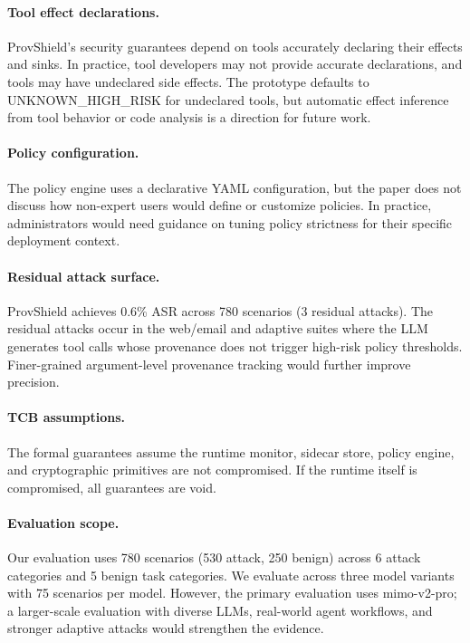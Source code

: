 \documentclass[sigconf,anonymous,review]{acmart}
\begin{document}
\paragraph{Tool effect declarations.} ProvShield's security guarantees depend on tools accurately declaring their effects and sinks. In practice, tool developers may not provide accurate declarations, and tools may have undeclared side effects. The prototype defaults to UNKNOWN\_HIGH\_RISK for undeclared tools, but automatic effect inference from tool behavior or code analysis is a direction for future work.

\paragraph{Policy configuration.} The policy engine uses a declarative YAML configuration, but the paper does not discuss how non-expert users would define or customize policies. In practice, administrators would need guidance on tuning policy strictness for their specific deployment context.

\paragraph{Residual attack surface.} ProvShield achieves 0.6\% ASR across 780 scenarios (3 residual attacks). The residual attacks occur in the web/email and adaptive suites where the LLM generates tool calls whose provenance does not trigger high-risk policy thresholds. Finer-grained argument-level provenance tracking would further improve precision.

\paragraph{TCB assumptions.} The formal guarantees assume the runtime monitor, sidecar store, policy engine, and cryptographic primitives are not compromised. If the runtime itself is compromised, all guarantees are void.
\paragraph{Evaluation scope.} Our evaluation uses 780 scenarios (530 attack, 250 benign) across 6 attack categories and 5 benign task categories. We evaluate across three model variants with 75 scenarios per model. However, the primary evaluation uses mimo-v2-pro; a larger-scale evaluation with diverse LLMs, real-world agent workflows, and stronger adaptive attacks would strengthen the evidence.
\end{document}
